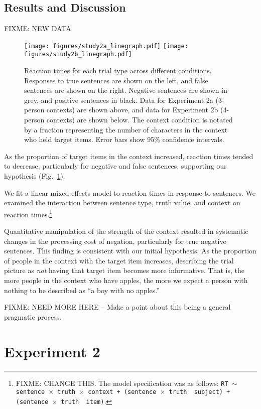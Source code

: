 \documentclass[man]{apa2}
\begin{document}
\subsection{Results and Discussion}


FIXME: NEW DATA
\begin{figure}[t]
\begin{center} 
\texttt{[image: figures/study2a\_linegraph.pdf]}
\texttt{[image: figures/study2b\_linegraph.pdf]}
\caption{\label{fig:e2line} Reaction times for each trial type across different conditions. Responses to true sentences are shown on the left, and false sentences are shown on the right.  Negative sentences are shown in grey, and positive sentences in black.  Data for Experiment 2a (3-person contexts) are shown above, and data for Experiment 2b (4-person contexts) are shown below.  The context condition is notated by a fraction representing the number of characters in the context who held target items. Error bars show 95\% confidence intervals.  }
\end{center} 
\end{figure}

As the proportion of target items in the context increased, reaction times tended to decrease, particularly for negative and false sentences, supporting our hypothesis (Fig.\ \ref{fig:e2line}).  

We fit a linear mixed-effects model to reaction times in response to sentences.  We examined the interaction between sentence type, truth value, and context on reaction times.\footnote{FIXME: CHANGE THIS.  The model specification was as follows: \texttt{RT $\sim$ sentence~$\times$~truth~$\times$~context + (sentence~$\times$~truth~\textbar~subject) +  (sentence~$\times$~truth~\textbar~item)}.}  

Quantitative manipulation of the strength of the context resulted in systematic changes in the processing cost of negation, particularly for true negative sentences.  This finding is consistent with our initial hypothesis: As the proportion of people in the context with the target item increases, describing the trial picture as \emph{not} having that target item becomes more informative.  That is, the more people in the context who have apples, the more we expect a person with nothing to be described as ``a boy with no apples.'' 

FIXME: NEED MORE HERE -- Make a point about this being a general pragmatic process.  

\section{Experiment 2}
\end{document}
